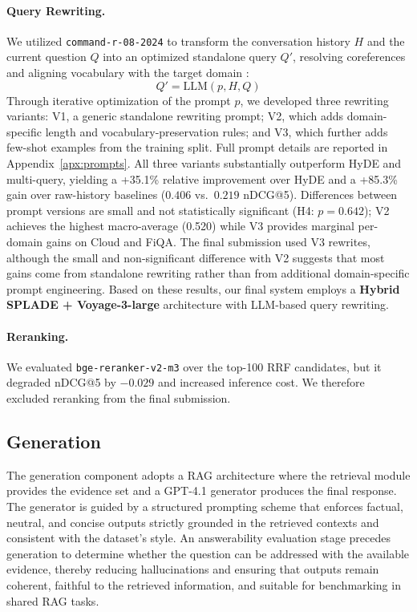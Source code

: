 \documentclass[11pt]{article}
\begin{document}
\paragraph{Query Rewriting.}
We utilized \texttt{command-r-08-2024} to transform the conversation history $H$ and the current question $Q$ into an optimized standalone query $Q'$, resolving coreferences and aligning vocabulary with the target domain \cite{elgohary-etal-2019-unpack}: 
\begin{equation}
    Q' = \text{LLM}(p, H, Q)
\end{equation}
Through iterative optimization of the prompt $p$, we developed three rewriting variants: V1, a generic standalone rewriting prompt; V2, which adds domain-specific length and vocabulary-preservation rules; and V3, which further adds few-shot examples from the training split. Full prompt details are reported in Appendix~\ref{apx:prompts}.
All three variants substantially outperform HyDE and multi-query, yielding a +35.1\% relative improvement over HyDE and a +85.3\% gain over raw-history baselines ($0.406$ vs.\ $0.219$ nDCG@5). Differences between prompt versions are small and not statistically significant (H4: $p = 0.642$); V2 achieves the highest macro-average (0.520) while V3 provides marginal per-domain gains on Cloud and FiQA.
The final submission used V3 rewrites, although the small and non-significant difference with V2 suggests that most gains come from standalone rewriting rather than from additional domain-specific prompt engineering.
Based on these results, our final system employs a \textbf{Hybrid SPLADE + Voyage-3-large} architecture with LLM-based query rewriting.


\paragraph{Reranking.}
We evaluated \texttt{bge-reranker-v2-m3} over the top-100 RRF candidates, but it degraded nDCG@5 by $-0.029$ and increased inference cost. We therefore excluded reranking from the final submission.

\subsection{Generation}

The generation component adopts a RAG architecture where the retrieval module provides the evidence set and a GPT-4.1 \cite{openai2025gpt41} generator produces the final response. The generator is guided by a structured prompting scheme that enforces factual, neutral, and concise outputs strictly grounded in the retrieved contexts and consistent with the dataset’s style. An answerability evaluation stage precedes generation to determine whether the question can be addressed with the available evidence, thereby reducing hallucinations and ensuring that outputs remain coherent, faithful to the retrieved information, and suitable for benchmarking in shared RAG tasks.
\end{document}
